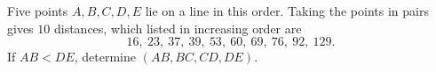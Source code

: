 Five points $A,B,C,D,E$ lie on a line in this order. Taking the points in pairs gives $10$ distances, which listed in increasing order are
\[
16,\ 23,\ 37,\ 39,\ 53,\ 60,\ 69,\ 76,\ 92,\ 129 .
\]
If $AB<DE$, determine $(AB,BC,CD,DE)$.
